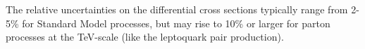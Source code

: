 \begin{enumerate}
The relative uncertainties on the differential cross sections 
typically range from 2-5\% for Standard Model processes, 
but may rise to 10\% or larger for parton processes at the TeV-scale 
(like the leptoquark pair production).

\end{enumerate}
%
%

